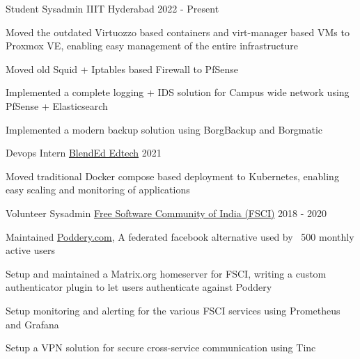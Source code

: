 
\begin{cventries}
  \cventry
    {Student Sysadmin} %
    {IIIT Hyderabad} %
    {} %
    {2022 - Present} %
    {
      \begin{cvitems} %
        \item {Moved the outdated Virtuozzo based containers and virt-manager based VMs to Proxmox VE, enabling easy management of the entire infrastructure}
        \item {Moved old Squid + Iptables based Firewall to PfSense}
        \item {Implemented a complete logging + IDS solution for Campus wide network using PfSense + Elasticsearch}
        \item {Implemented a modern backup solution using BorgBackup and Borgmatic}
      \end{cvitems}
    }

  \cventry
    {Devops Intern} %
    {\href{https://blend-ed.org/}{BlendEd Edtech}} %
    {} %
    {2021} %
    {
      \begin{cvitems} %
        \item {Moved traditional Docker compose based deployment to Kubernetes, enabling easy scaling and monitoring of applications}
      \end{cvitems}
    }

    \cventry
    {Volunteer Sysadmin} %
    {\href{https://fsci.in}{Free Software Community of India (FSCI)}} %
    {} %
    {2018 - 2020} %
    {
      \begin{cvitems} %
        \item {Maintained \href{https://poddery.com}{Poddery.com}, A federated facebook alternative used by ~500 monthly active users}
        \item {Setup and maintained a Matrix.org homeserver for FSCI, writing a custom authenticator plugin to let users authenticate against Poddery}
        \item {Setup monitoring and alerting for the various FSCI services using Prometheus and Grafana}
        \item {Setup a VPN solution for secure cross-service communication using Tinc}
      \end{cvitems}
    }
\end{cventries}
